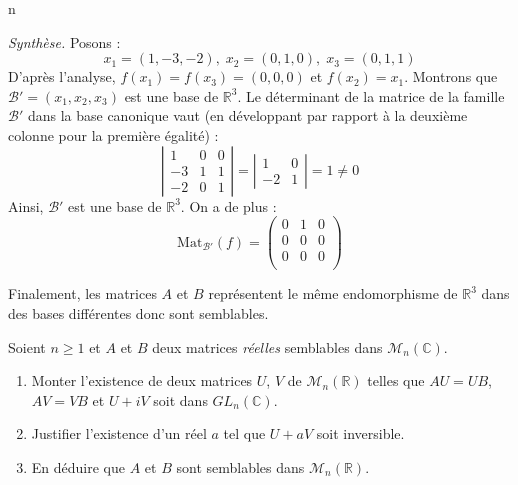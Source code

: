 n\documentclass[a4paper,10pt]{report}
\begin{document}
\noindent \textit{Synthèse.} Posons :
$$ x_1 =(1,-3,-2), \; x_2 = (0,1,0), \; x_3= (0,1,1)$$
D'après l'analyse, $f(x_1)=f(x_3)=(0,0,0)$ et $f(x_2)=x_1$. Montrons que $\mathcal{B}'=(x_1,x_2,x_3)$ est une base de $\mathbb{R}^3$. Le déterminant de la matrice de la famille $\mathcal{B}'$ dans la base canonique vaut (en développant par rapport à la deuxième colonne pour la première égalité) :
$$ \left\vert \begin{array}{ccc}
1 & 0 & 0 \\
-3 & 1 & 1 \\
-2 & 0 & 1 
\end{array}\right\vert =  \left\vert \begin{array}{cc} 1 & 0 \\
-2 & 1\end{array}\right\vert =1 \neq 0 $$
Ainsi, $\mathcal{B}'$ est une base de $\mathbb{R}^3$. On a de plus :
$$ \textrm{Mat}_{\mathcal{B}'}(f) = \begin{pmatrix}
0 & 1 & 0 \\
0 & 0 & 0 \\
0 & 0 & 0 \\
\end{pmatrix}$$

\medskip

\noindent Finalement, les matrices $A$ et $B$ représentent le même endomorphisme de $\mathbb{R}^3$ dans des bases différentes donc sont semblables.

\begin{Exa} Soient $n \geq 1$ et $A$ et $B$ deux matrices \textit{réelles} semblables dans $\mathcal{M}_n(\mathbb{C})$.

\begin{enumerate}
\item Monter l'existence de deux matrices $U$, $V$ de $\mathcal{M}_n(\mathbb{R})$ telles que $AU=UB$, $AV=VB$ et $U+iV$ soit dans $GL_n(\mathbb{C})$.
\item Justifier l'existence d'un réel $a$ tel que $U+aV$ soit inversible.
\item En déduire que $A$ et $B$ sont semblables dans $\mathcal{M}_n(\mathbb{R})$.
\end{enumerate}
\end{Exa} 
\end{document}
